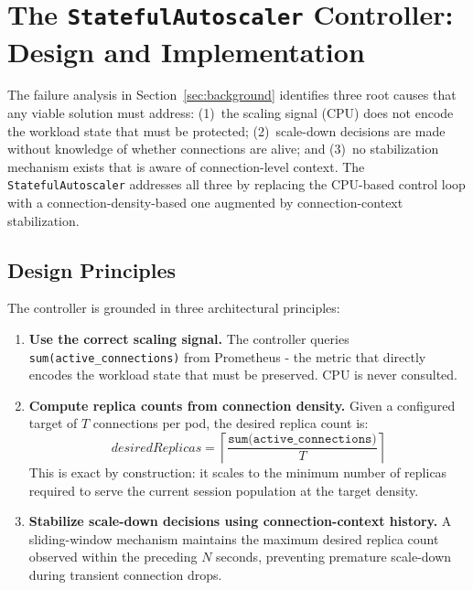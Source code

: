 \documentclass[3p,twocolumn]{elsarticle}
\theoremstyle{plain}%
\theoremstyle{definition}%
\begin{document}
\section{The \texttt{StatefulAutoscaler} Controller: Design and Implementation}
\label{sec:controller}

The failure analysis in Section~\ref{sec:background} identifies three root causes
that any viable solution must address: (1)~the scaling signal (CPU) does not encode the
workload state that must be protected; (2)~scale-down decisions are made without knowledge
of whether connections are alive; and (3)~no stabilization mechanism exists that is aware of
connection-level context. The \texttt{StatefulAutoscaler} addresses all three by replacing the
CPU-based control loop with a connection-density-based one augmented by
connection-context stabilization.

\subsection{Design Principles}

The controller is grounded in three architectural principles:

\begin{enumerate}[leftmargin=*]
\item \textbf{Use the correct scaling signal.} The controller queries
  \texttt{sum(active\_connections)} from Prometheus - the metric that directly encodes the
  workload state that must be preserved. CPU is never consulted.

\item \textbf{Compute replica counts from connection density.} Given a configured target of
  $T$ connections per pod, the desired replica count is:
  \begin{equation}
  \textit{desiredReplicas} = \left\lceil \frac{\texttt{sum(active\_connections)}}{T} \right\rceil
  \label{eq:stateful}
  \end{equation}
  This is exact by construction: it scales to the minimum number of replicas required to
  serve the current session population at the target density.

\item \textbf{Stabilize scale-down decisions using connection-context history.} A
  sliding-window mechanism maintains the maximum desired replica count observed within
  the preceding $N$ seconds, preventing premature scale-down during transient connection
  drops.
\end{enumerate}
\end{document}
